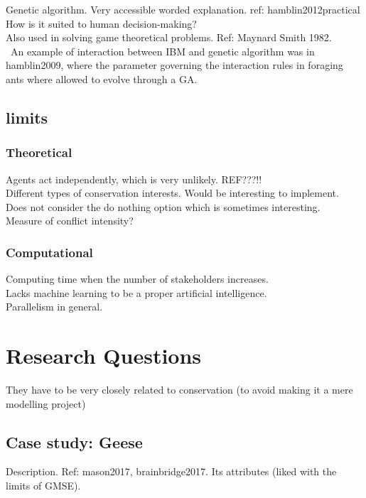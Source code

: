 \documentclass[12pt,a4paper]{article}
\begin{document}
Genetic algorithm. Very accessible worded explanation. ref: hamblin2012practical\\
How is it suited to human decision-making?\\
Also used in solving game theoretical problems. Ref: Maynard Smith 1982.\\\
An example of interaction between IBM and genetic algorithm was in hamblin2009, where the parameter governing the interaction rules in foraging ants where allowed to evolve through a GA.

\subsection{limits}

\subsubsection{Theoretical}

Agents act independently, which is very unlikely. REF???!!\\
Different types of conservation interests.
Would be interesting to implement.\\
Does not consider the do nothing option which is sometimes interesting.\\
Measure of conflict intensity?

\subsubsection{Computational}
Computing time when the number of stakeholders increases.\\
Lacks machine learning to be a proper artificial intelligence.\\
Parallelism in general.

\section{Research Questions}

They have to be very closely related to conservation (to avoid making it a mere modelling project)

\subsection{Case study: Geese}

Description. Ref: mason2017, brainbridge2017.
Its attributes (liked with the limits of GMSE). 
\end{document}
